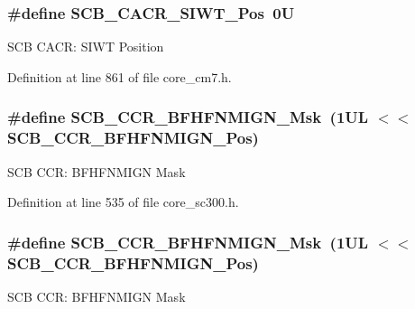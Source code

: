 \subsubsection[{\texorpdfstring{S\+C\+B\+\_\+\+C\+A\+C\+R\+\_\+\+S\+I\+W\+T\+\_\+\+Pos}{SCB_CACR_SIWT_Pos}}]{\setlength{\rightskip}{0pt plus 5cm}\#define S\+C\+B\+\_\+\+C\+A\+C\+R\+\_\+\+S\+I\+W\+T\+\_\+\+Pos~0U}\hypertarget{group___c_m_s_i_s___s_c_b_gafda198ad429d0a5c865e75d42afa12a2}{}\label{group___c_m_s_i_s___s_c_b_gafda198ad429d0a5c865e75d42afa12a2}
S\+CB C\+A\+CR\+: S\+I\+WT Position 

Definition at line 861 of file core\+\_\+cm7.\+h.

\subsubsection[{\texorpdfstring{S\+C\+B\+\_\+\+C\+C\+R\+\_\+\+B\+F\+H\+F\+N\+M\+I\+G\+N\+\_\+\+Msk}{SCB_CCR_BFHFNMIGN_Msk}}]{\setlength{\rightskip}{0pt plus 5cm}\#define S\+C\+B\+\_\+\+C\+C\+R\+\_\+\+B\+F\+H\+F\+N\+M\+I\+G\+N\+\_\+\+Msk~(1\+U\+L $<$$<$ S\+C\+B\+\_\+\+C\+C\+R\+\_\+\+B\+F\+H\+F\+N\+M\+I\+G\+N\+\_\+\+Pos)}\hypertarget{group___c_m_s_i_s___s_c_b_ga89a28cc31cfc7d52d9d7a8fcc69c7eac}{}\label{group___c_m_s_i_s___s_c_b_ga89a28cc31cfc7d52d9d7a8fcc69c7eac}
S\+CB C\+CR\+: B\+F\+H\+F\+N\+M\+I\+GN Mask 

Definition at line 535 of file core\+\_\+sc300.\+h.

\subsubsection[{\texorpdfstring{S\+C\+B\+\_\+\+C\+C\+R\+\_\+\+B\+F\+H\+F\+N\+M\+I\+G\+N\+\_\+\+Msk}{SCB_CCR_BFHFNMIGN_Msk}}]{\setlength{\rightskip}{0pt plus 5cm}\#define S\+C\+B\+\_\+\+C\+C\+R\+\_\+\+B\+F\+H\+F\+N\+M\+I\+G\+N\+\_\+\+Msk~(1\+U\+L $<$$<$ S\+C\+B\+\_\+\+C\+C\+R\+\_\+\+B\+F\+H\+F\+N\+M\+I\+G\+N\+\_\+\+Pos)}\hypertarget{group___c_m_s_i_s___s_c_b_ga89a28cc31cfc7d52d9d7a8fcc69c7eac}{}\label{group___c_m_s_i_s___s_c_b_ga89a28cc31cfc7d52d9d7a8fcc69c7eac}
S\+CB C\+CR\+: B\+F\+H\+F\+N\+M\+I\+GN Mask 


